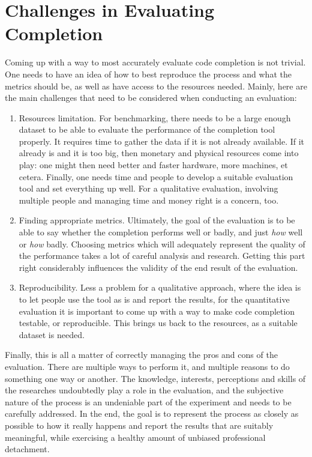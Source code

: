 \section{Challenges in Evaluating Completion}
\label{sec:Evaluation-Challenges}
Coming up with a way to most accurately evaluate code completion is not trivial. One needs to have an idea of how to best reproduce the process and what the metrics should be, as well as have access to the resources needed. Mainly, here are the main challenges that need to be considered when conducting an evaluation:
\begin{enumerate}
    \item Resources limitation. For benchmarking, there needs to be a large enough dataset to be able to evaluate the performance of the completion tool properly. It requires time to gather the data if it is not already available. If it already is and it is too big, then monetary and physical resources come into play: one might then need better and faster hardware, more machines, et cetera. Finally, one needs time and people to develop a suitable evaluation tool and set everything up well. For a qualitative evaluation, involving multiple people and managing time and money right is a concern, too. 
    \item Finding appropriate metrics. Ultimately, the goal of the evaluation is to be able to say whether the completion performs well or badly, and just \textit{how} well or \textit{how} badly. Choosing metrics which will adequately represent the quality of the performance takes a lot of careful analysis and research. Getting this part right considerably influences the validity of the end result of the evaluation.
    \item Reproducibility. Less a problem for a qualitative approach, where the idea is to let people use the tool as is and report the results, for the quantitative evaluation it is important to come up with a way to make code completion testable, or reproducible. This brings us back to the resources, as a suitable dataset is needed.
\end{enumerate}

Finally, this is all a matter of correctly managing the pros and cons of the evaluation. There are multiple ways to perform it, and multiple reasons to do something one way or another. The knowledge, interests, perceptions and skills of the researches undoubtedly play a role in the evaluation, and the subjective nature of the process is an undeniable part of the experiment and needs to be carefully addressed. In the end, the goal is to represent the process as closely as possible to how it really happens and report the results that are suitably meaningful, while exercising a healthy amount of unbiased professional detachment.

